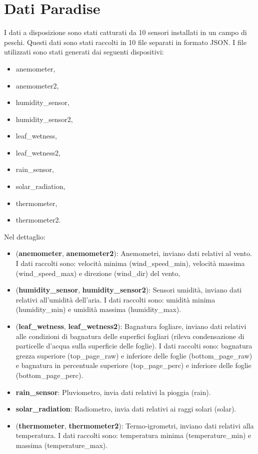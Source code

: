 \documentclass{article}
\begin{document}
\thispagestyle{empty}
\newpage

\tableofcontents

\thispagestyle{empty}

\clearpage
{}

\section{Dati Paradise}
I dati a disposizione sono stati catturati da 10 sensori installati in un campo di peschi. Questi dati sono stati raccolti in 10 file separati in formato JSON. I file utilizzati sono stati generati dai seguenti dispositivi:
\begin{itemize}[noitemsep]
  \item anemometer,
  \item anemometer2,
  \item humidity\_sensor,
  \item humidity\_sensor2,
  \item leaf\_wetness,
  \item leaf\_wetness2,
  \item rain\_sensor,
  \item solar\_radiation,
  \item thermometer,
  \item thermometer2.
\end{itemize}
Nel dettaglio:
\begin{itemize}[noitemsep]
  \item (\textbf{anemometer}, \textbf{anemometer2}): Anemometri, inviano dati relativi al vento. I dati raccolti sono: velocità minima (wind\_speed\_min), velocità massima (wind\_speed\_max) e direzione (wind\_dir) del vento,
  \item (\textbf{humidity\_sensor}, \textbf{humidity\_sensor2}): Sensori umidità, inviano dati relativi all'umidità dell'aria. I dati raccolti sono: umidità minima (humidity\_min) e umidità massima (humidity\_max).
  \item (\textbf{leaf\_wetness}, \textbf{leaf\_wetness2}): Bagnatura fogliare, inviano dati relativi alle condizioni di bagnatura delle superfici fogliari (rileva condensazione di particelle d'acqua sulla superficie delle foglie). I dati raccolti sono: bagnatura grezza superiore (top\_page\_raw) e inferiore delle foglie (bottom\_page\_raw) e bagnatura in percentuale superiore (top\_page\_perc) e inferiore delle foglie (bottom\_page\_perc).
  \item \textbf{rain\_sensor}: Pluviometro, invia dati relativi la pioggia (rain).
  \item \textbf{solar\_radiation}: Radiometro, invia dati relativi ai raggi solari (solar).
  \item (\textbf{thermometer}, \textbf{thermometer2}): Termo-igrometri, inviano dati relativi alla temperatura. I dati raccolti sono: temperatura minima (temperature\_min) e massima (temperature\_max).
\end{itemize}
\end{document}
